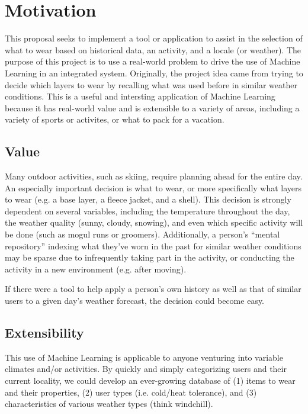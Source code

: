 \section{Motivation}
\label{section:motivation}
This proposal seeks to implement a tool or application to assist in the selection of what to wear based on
historical data, an activity, and a locale (or weather). The purpose of this project is to use a real-world
problem to drive the use of Machine Learning in an integrated system. Originally, the project idea came from trying
to decide which layers to wear by recalling what was used before in similar weather conditions. This is a
useful and intersting application of Machine Learning because it has real-world value and is extensible to a variety
of areas, including a variety of sports or activites, or what to pack for a vacation.

\subsection{Value}
Many outdoor activities, such as skiing, require planning ahead for the entire day. An especially important
decision is what to wear, or more specifically what layers to wear (e.g. a base layer, a fleece jacket, and a shell).
This decision is strongly dependent on several variables, including the temperature throughout the day, the weather
quality (sunny, cloudy, snowing), and even which specific activity will be done (such as mogul runs or groomers).
Additionally, a person's ``mental repository'' indexing what they've worn in the past for similar weather conditions
may be sparse due to infrequently taking part in the activity, or conducting the activity in a new environment (e.g.
after moving).

If there were a tool to help apply a person's own history as well as that of similar users to a given day's weather
forecast, the decision could become easy.

\subsection{Extensibility}
This use of Machine Learning is applicable to anyone venturing into variable climates and/or activities.
By quickly and simply categorizing
users and their current locality, we could develop an ever-growing database of (1) items to wear and their properties,
(2) user types (i.e. cold/heat tolerance), and (3) characteristics of various weather types (think windchill).

